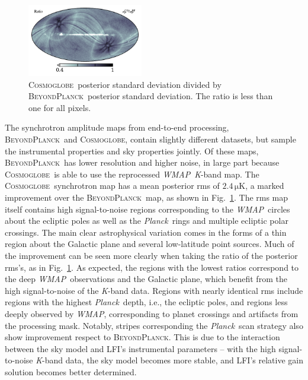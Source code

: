 \documentclass[twocolumn]{../../common/aa}
\def\WMAP{\emph{WMAP}}
\def\Planck{\emph{Planck}}
\newcommand{\bp}{\textsc{BeyondPlanck}}
\newcommand{\cosmoglobe}{\textsc{Cosmoglobe}}
\newcommand{\K}[0]{\textit K}
\begin{document}


\begin{figure}
	\centering
	\includegraphics[width=0.45\textwidth]{figures/polint_sigma_ratio.pdf}
	\caption{
		\cosmoglobe\ posterior standard deviation divided by \bp\ posterior standard deviation. The ratio is less than one for all pixels.
		}
		\label{fig:rms_ratios}
\end{figure}


The synchrotron amplitude maps from end-to-end processing, \bp\ and \cosmoglobe, contain slightly different datasets, but sample the instrumental properties and sky properties jointly. Of these maps, \bp\ has lower resolution and higher noise, in large part because \cosmoglobe\ is able to use the reprocessed \WMAP\ \K-band map.
The \cosmoglobe\ synchrotron map has a mean posterior rms of $2.4\,\mathrm{\mu K}$, a marked improvement over the \bp\ map, as shown in Fig.~\ref{fig:rms_ratios}. The rms map itself contains high signal-to-noise regions corresponding to the \WMAP\ circles about the ecliptic poles as well as the \Planck\ rings and multiple ecliptic polar crossings. The main clear astrophysical variation comes in the forms of a thin region about the Galactic plane and several low-latitude point sources. Much of the improvement can be seen more clearly when taking the ratio of the posterior rms's, as in Fig.~\ref{fig:rms_ratios}. As expected, the regions with the lowest ratios correspond to the deep \WMAP\ observations and the Galactic plane, which benefit from the high signal-to-noise of the \K-band data. Regions with nearly identical rms include regions with the highest \Planck\ depth, i.e., the ecliptic poles, and regions less deeply observed by \WMAP, corresponding to planet crossings and artifacts from the processing mask. Notably, stripes corresponding the \Planck\ scan strategy also show improvement respect to \bp. This is due to the interaction between the sky model and LFI's instrumental parameters -- with the high signal-to-noise \K-band data, the sky model becomes more stable, and LFI's relative gain solution becomes better determined.
\end{document}
